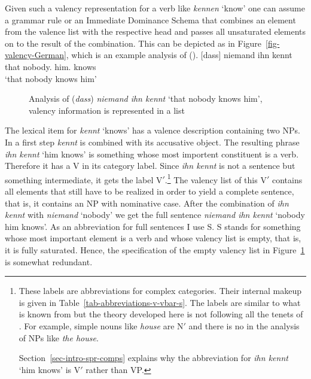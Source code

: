 Given such a valency representation for a verb like \emph{kennen} `know' one can assume a grammar rule
or an Immediate Dominance Schema that combines an element from the valence list with the respective head
and passes all unsaturated elements on to the result of the combination. This can be depicted as in
Figure~\vref{fig-valency-German}, which is an example analysis of ().
\ea
\label{ex-dass-niemand-ihn-kennt}
\gll  {}[dass] niemand ihn kennt\\
      \spacebr{}that nobody.\NOM{} him.\ACC{} knows\\ 
\glt `that nobody knows him'
\z
\begin{figure}
\caption{\label{fig-valency-German}Analysis of (\emph{dass}) \emph{niemand ihn kennt} `that nobody
  knows him', valency information is represented in a list}
\end{figure}

The lexical item for \emph{kennt} `knows' has a valence description containing two NPs. In a first
step \emph{kennt} is combined with its accusative object. The resulting phrase \emph{ihn kennt} `him
knows' is something whose most importent constituent is a verb. Therefore it has a V in its category
label. Since \emph{ihn kennt} is not a sentence but something intermediate, it gets the label
V$'$.\footnote{%
  These labels are abbreviations for complex categories. Their internal makeup is given in
  Table~\ref{tab-abbreviations-v-vbar-s}. The labels are similar to what is known from \xbart but
  the theory developed here is not following all the tenets of \xbart. For example, simple nouns
  like \emph{house} are N$'$ and there is no \nnull in the analysis of NPs like \emph{the house}.

  Section~\ref{sec-intro-spr-comps} explains why the abbreviation for \emph{ihn kennt} `him knows' is V$'$ rather than VP.
} The valency list of this V$'$ contains all elements that still have to be realized in order to
yield a complete sentence, that is, it contains an NP with nominative case. After the combination of
\emph{ihn kennt} with \emph{niemand} `nobody' we get the full sentence \emph{niemand ihn kennt}
`nobody him knows'. As an abbreviation for full sentences I use S. S stands for something whose most
important element is a verb and whose valency list is empty, that is, it is fully saturated. Hence,
the specification of the empty valency list in Figure~\ref{fig-valency-German} is somewhat redundant.

